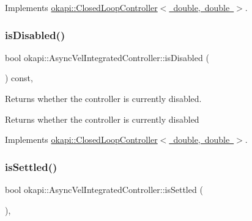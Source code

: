 Implements \mbox{\hyperlink{classokapi_1_1ClosedLoopController_a22012bedbfaff6e5a3a508f274ec2497}{okapi\+::\+Closed\+Loop\+Controller$<$ double, double $>$}}.

\mbox{\label{classokapi_1_1AsyncVelIntegratedController_ad4c6394b3512ae44ffa36c9e01f6321b}} 
\subsubsection{\texorpdfstring{isDisabled()}{isDisabled()}}
{\footnotesize\ttfamily bool okapi\+::\+Async\+Vel\+Integrated\+Controller\+::is\+Disabled (\begin{DoxyParamCaption}{ }\end{DoxyParamCaption}) const\hspace{0.3cm}{\ttfamily [override]}, {\ttfamily [virtual]}}

Returns whether the controller is currently disabled.

\begin{DoxyReturn}{Returns}
whether the controller is currently disabled 
\end{DoxyReturn}


Implements \mbox{\hyperlink{classokapi_1_1ClosedLoopController_a40bd4ec2b8c75503fbf6f494fd7cbe69}{okapi\+::\+Closed\+Loop\+Controller$<$ double, double $>$}}.

\mbox{\label{classokapi_1_1AsyncVelIntegratedController_a8518d706827ccc8d42d0a401566d58f7}} 
\subsubsection{\texorpdfstring{isSettled()}{isSettled()}}
{\footnotesize\ttfamily bool okapi\+::\+Async\+Vel\+Integrated\+Controller\+::is\+Settled (\begin{DoxyParamCaption}{ }\end{DoxyParamCaption})\hspace{0.3cm}{\ttfamily [override]}, {\ttfamily [virtual]}}

